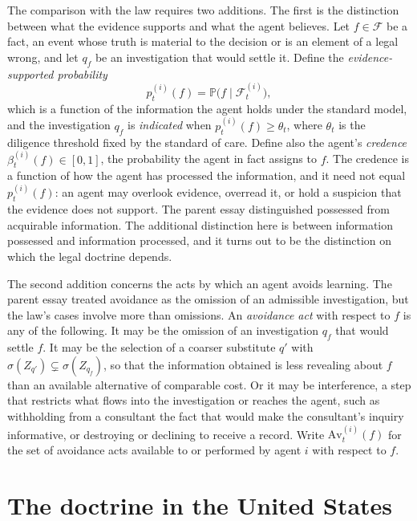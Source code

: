 \documentclass[11pt]{article}
\newcommand{\F}{\mathcal F}
\newcommand{\PP}{\mathbb P}
\theoremstyle{plain}
\theoremstyle{definition}
\begin{document}
The comparison with the law requires two additions. The first is the distinction between what the evidence supports and what the agent believes. Let $f\in\F$ be a fact, an event whose truth is material to the decision or is an element of a legal wrong, and let $q_f$ be an investigation that would settle it. Define the \emph{evidence-supported probability}
\[
p^{(i)}_t(f)=\PP\bigl(f\mid\F^{(i)}_t\bigr),
\]
which is a function of the information the agent holds under the standard model, and the investigation $q_f$ is \emph{indicated} when $p^{(i)}_t(f)\ge\theta_t$, where $\theta_t$ is the diligence threshold fixed by the standard of care. Define also the agent's \emph{credence} $\beta^{(i)}_t(f)\in[0,1]$, the probability the agent in fact assigns to $f$. The credence is a function of how the agent has processed the information, and it need not equal $p^{(i)}_t(f)$: an agent may overlook evidence, overread it, or hold a suspicion that the evidence does not support. The parent essay distinguished possessed from acquirable information. The additional distinction here is between information possessed and information processed, and it turns out to be the distinction on which the legal doctrine depends.

The second addition concerns the acts by which an agent avoids learning. The parent essay treated avoidance as the omission of an admissible investigation, but the law's cases involve more than omissions. An \emph{avoidance act} with respect to $f$ is any of the following. It may be the omission of an investigation $q_f$ that would settle $f$. It may be the selection of a coarser substitute $q'$ with $\sigma(Z_{q'})\subsetneq\sigma(Z_{q_f})$, so that the information obtained is less revealing about $f$ than an available alternative of comparable cost. Or it may be interference, a step that restricts what flows into the investigation or reaches the agent, such as withholding from a consultant the fact that would make the consultant's inquiry informative, or destroying or declining to receive a record. Write $\mathrm{Av}^{(i)}_t(f)$ for the set of avoidance acts available to or performed by agent $i$ with respect to $f$.

\section{The doctrine in the United States}
\end{document}

